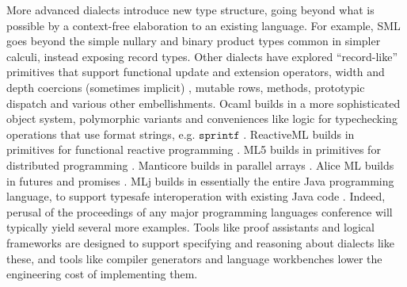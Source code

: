 More advanced dialects introduce  new type structure, going beyond what is possible by a context-free elaboration to an existing language. For example, SML goes beyond the simple nullary and binary product types common in simpler calculi, instead exposing record types. Other dialects have explored ``record-like'' primitives that support functional update and extension operators, width and depth coercions (sometimes implicit)%
, mutable rows, methods, prototypic dispatch and various other embellishments. Ocaml builds in a more  sophisticated object system, polymorphic variants and  conveniences like logic for typechecking operations that use format strings, e.g. $\mathtt{sprintf}$ \cite{ocaml-manual}. ReactiveML builds in primitives for functional reactive programming \cite{mandel2005reactiveml}.  ML5 builds in primitives for distributed programming \cite{Murphy:2007:TDP:1793574.1793585}. Manticore builds in parallel arrays \cite{conf/popl/FluetRRSX07}. Alice ML builds in futures and promises \cite{AliceLookingGlass}. MLj builds in essentially the entire Java programming language, to support typesafe interoperation with existing Java code \cite{Benton:1999:IWW:317636.317791}. Indeed, perusal of the proceedings of any major programming languages conference will typically yield several more examples. Tools like proof assistants and logical frameworks are designed to support specifying and reasoning about dialects like these, and tools like compiler generators and language workbenches lower the engineering cost of implementing them. 



